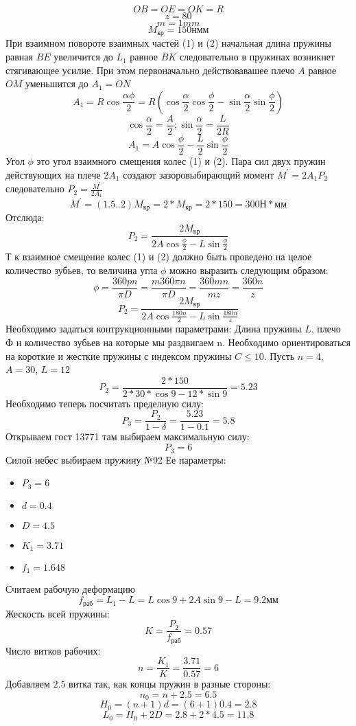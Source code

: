 \documentclass{article}
\begin{document}
$$
OB = OE = OK = R
$$
$$
z = 80
$$
$$
m = 1 mm
$$
$$
M_{кр} = 150 н мм
$$
При взаимном повороте взаимных частей (1) и (2) начальная длина пружины равная $BE$ увеличится до $L_1$ равное $BK$ следовательно в пружинах возникнет стягивающее усилие. При этом первоначально действовавашее плечо $A$ равное $OM$ уменьшится до $A_1 = ON$
$$
A_1 = R \cos{ \frac{ \alpha \phi}{2} } = R (\cos{ \frac{ \alpha}{2}}\cos{ \frac{ \phi}{2} } - \sin{ \frac{ \alpha}{2} } \sin{ \frac{ \phi}{2} })
$$
$$
\cos{ \frac{ \alpha}{2} } = \frac{A}{2}; \sin{ \frac{ \alpha}{2} } = \frac{L}{2R} 
$$
$$
A_1 = A \cos{ \frac{ \phi}{2}} - \frac{L}{2} \sin{ \frac{ \phi}{2} }
$$
Угол $ \phi$ это угол взаимного смещения колес (1) и (2). Пара сил двух пружин действующих на плече $2A_1$ создают зазоровыбирающий момент $M^' = 2 A_1 P_2$ следовательно $P_2 = \frac{M^'}{2A_1} $
$$
M^' = (1.5 .. 2) M_{кр} = 2 * M_{кр} = 2 * 150 = 300 Н * мм
$$
Отслюда:
$$
P_2 = \frac{2 M_{кр}}{2 A \cos{ \frac {\phi}{2}} - L \sin{ \frac{ \phi}{2} }} 
$$
Т к взаимное смещение колес (1) и (2) должно быть проведено на целое количество зубьев, то величина угла $ \phi$ можно выразить следующим образом:
$$
\phi = \frac{360 p n}{ \pi D } = \frac{m 360 \pi n}{ \pi D } = \frac{360 m n}{m z} = \frac{360 n}{z}
$$
$$
P_2 = \frac{2 M_{кр}}{2A\cos{ \frac{180 n}{2} } - L \sin { \frac{180 n}{z}} } 
$$
Необходимо задаться контрукционными параметрами: Длина пружины $L$, плечо Ф и количество зубьев на которые мы раздвигаем n. Необходимо ориентироваться на короткие и жесткие пружины с индексом пружины $C \le 10$. Пусть $n = 4$, $A = 30$, $L = 12$
$$
P_2 = \frac{2 * 150}{2 * 30 * \cos {9} - 12 * \sin {9}} = 5.23
$$
Необходимо теперь посчитать пределную силу:
$$
P_3 = \frac{P_2 }{1 - \delta} = \frac{5.23}{1 - 0.1} = 5.8
$$
Открываем гост 13771 там выбираем максимальную силу:
$$
P_3 = 6
$$
Силой небес выбираем пружину №92
Ее параметры:
\begin{itemize}
	\item $P_3 = 6$
	\item $d = 0.4$
	\item $D = 4.5$
	\item $K_1 = 3.71$
	\item $f_1 = 1.648$
\end{itemize}

Считаем рабочую деформацию
$$
f_{раб} = L_1 - L = L \cos{9} + 2A \sin{9} - L = 9.2 мм
$$
Жескость всей пружины:
$$
K = \frac{P_2}{f_{раб}} = 0.57
$$
Число витков рабочих:
$$
n = \frac{K_1}{K} = \frac{3.71}{0.57} = 6
$$
Добавляем $2.5$ витка так, как концы пружин в разные стороны:
$$
n_0 = n + 2.5 = 6.5
$$
$$
H_0 = (n + 1) d = (6 + 1) 0.4 = 2.8
$$
$$
L_0 = H_0 + 2 D = 2.8 + 2 * 4.5 = 11.8
$$
\end{document}
